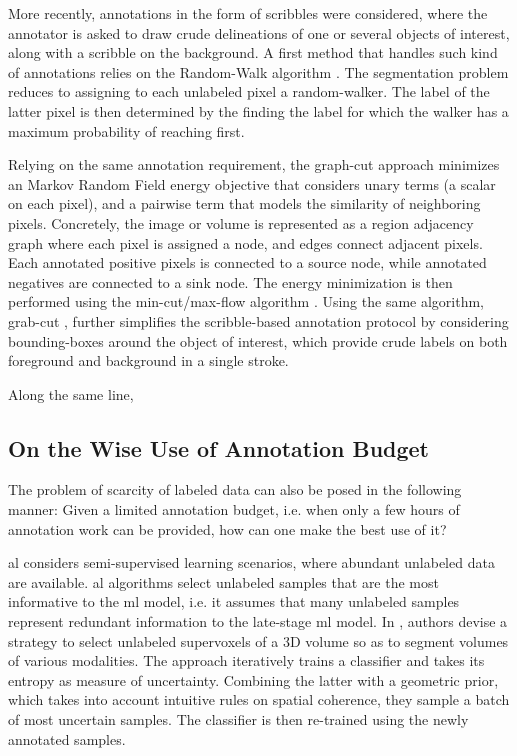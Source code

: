 More recently, annotations in the form of scribbles were considered, where the annotator is asked to draw crude delineations of one or several objects of interest, along with a scribble on the background.
A first method that handles such kind of annotations relies on the Random-Walk algorithm \cite{grady06}.
The segmentation problem reduces to assigning to each unlabeled pixel a random-walker. The label of the latter pixel is then determined by the finding the label for which the walker has a maximum probability of reaching first.

Relying on the same annotation requirement, the graph-cut approach \cite{Boykov2006}
minimizes an Markov Random Field energy objective that considers unary terms (a scalar on each pixel), and a pairwise term that models the similarity of neighboring pixels.
Concretely, the image or volume is represented as a region adjacency graph where each pixel is assigned a node, and edges connect adjacent pixels.
Each annotated positive pixels is connected to a source node, while annotated negatives are connected to a sink node.
The energy minimization is then performed using the min-cut/max-flow algorithm \cite{goldberg88}.
Using the same algorithm, grab-cut \cite{rother04}, further simplifies the scribble-based annotation protocol by considering bounding-boxes around the object of interest, which provide crude labels on both foreground and background in a single stroke.

Along the same line, \cite{criminisi08}

\subsection{On the Wise Use of Annotation Budget}
The problem of scarcity of labeled data can also be posed in the following manner:
Given a limited annotation budget, i.e. when only a few hours of annotation work can be provided, how can one make the best use of it?

\gls{al} \cite{settles09} considers semi-supervised learning scenarios, where abundant unlabeled data are available.
\gls{al} algorithms select unlabeled samples that are the most informative to the \gls{ml} model, i.e. it assumes that many unlabeled samples represent redundant information to the late-stage \gls{ml} model.
In \cite{KonSznFua15}, authors devise a strategy to select unlabeled supervoxels of a 3D volume so as to segment volumes of various modalities.
The approach iteratively trains a classifier and takes its entropy as measure of uncertainty.
Combining the latter with a geometric prior, which takes into account intuitive rules on spatial coherence, they sample a batch of most uncertain samples.
The classifier is then re-trained using the newly annotated samples.

